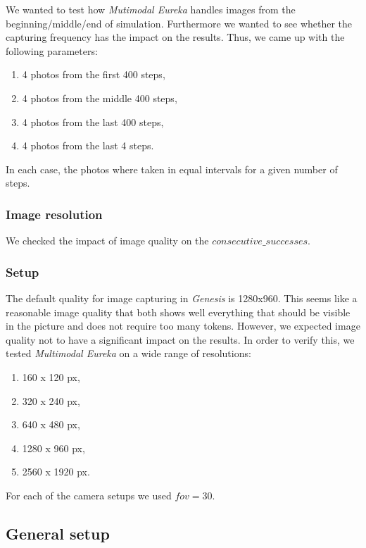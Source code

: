 \documentclass[10pt,twocolumn]{article}
\begin{document}
We wanted to test how \textit{Mutimodal Eureka} handles images from the beginning/middle/end of simulation. Furthermore we wanted to see whether the capturing frequency has the impact on the results. Thus, we came up with the following parameters:

\begin{enumerate}
    \item 4 photos from the first 400 steps,
    \item 4 photos from the middle 400 steps,
    \item 4 photos from the last 400 steps,
    \item 4 photos from the last 4 steps.
\end{enumerate}

In each case, the photos where taken in equal intervals for a given number of steps.

\subsubsection{Image resolution}

We checked the impact of image quality on the $consecutive\_successes$.

\subsubsection*{Setup}

The default quality for image capturing in \textit{Genesis} is 1280x960. This seems like a reasonable image quality that both shows well everything that should be visible in the picture and does not require too many tokens. However, we expected image quality not to have a significant impact on the results. In order to verify this, we tested \textit{Multimodal Eureka} on a wide range of resolutions:

\begin{enumerate}
    \item 160 x 120 px,
    \item 320 x 240 px,
    \item 640 x 480 px,
    \item 1280 x 960 px,
    \item 2560 x 1920 px.
\end{enumerate}

\noindent For each of the camera setups we used $fov=30$.

\subsection{General setup}
\end{document}
